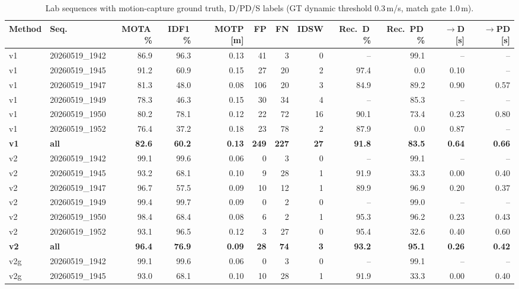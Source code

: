 \begin{table}[t]
\centering
\caption{Lab sequences with motion-capture ground truth, D/PD/S labels (GT dynamic threshold 0.3\,m/s, match gate 1.0\,m).}
\label{tab:own_r8a_full}
\setlength{\tabcolsep}{3pt}
\begin{tabular}{llrrrrrrrrrr}
\toprule
Method & Seq. & MOTA\,\% & IDF1\,\% & MOTP [m] & FP & FN & IDSW & Rec.\ D\,\% & Rec.\ PD\,\% & $\to$D [s] & $\to$PD [s] \\
\midrule
v1 & 20260519\_1942 & 86.9 & 96.3 & 0.13 & 41 & 3 & 0 & -- & 99.1 & -- & -- \\
v1 & 20260519\_1945 & 91.2 & 60.9 & 0.15 & 27 & 20 & 2 & 97.4 & 0.0 & 0.10 & -- \\
v1 & 20260519\_1947 & 81.3 & 48.0 & 0.08 & 106 & 20 & 3 & 84.9 & 89.2 & 0.90 & 0.57 \\
v1 & 20260519\_1949 & 78.3 & 46.3 & 0.15 & 30 & 34 & 4 & -- & 85.3 & -- & -- \\
v1 & 20260519\_1950 & 80.2 & 78.1 & 0.12 & 22 & 72 & 16 & 90.1 & 73.4 & 0.23 & 0.80 \\
v1 & 20260519\_1952 & 76.4 & 37.2 & 0.18 & 23 & 78 & 2 & 87.9 & 0.0 & 0.87 & -- \\
\textbf{v1} & \textbf{all} & \textbf{82.6} & \textbf{60.2} & \textbf{0.13} & \textbf{249} & \textbf{227} & \textbf{27} & \textbf{91.8} & \textbf{83.5} & \textbf{0.64} & \textbf{0.66} \\
\midrule
v2 & 20260519\_1942 & 99.1 & 99.6 & 0.06 & 0 & 3 & 0 & -- & 99.1 & -- & -- \\
v2 & 20260519\_1945 & 93.2 & 68.1 & 0.10 & 9 & 28 & 1 & 91.9 & 33.3 & 0.00 & 0.40 \\
v2 & 20260519\_1947 & 96.7 & 57.5 & 0.09 & 10 & 12 & 1 & 89.9 & 96.9 & 0.20 & 0.37 \\
v2 & 20260519\_1949 & 99.4 & 99.7 & 0.09 & 0 & 2 & 0 & -- & 99.0 & -- & -- \\
v2 & 20260519\_1950 & 98.4 & 68.4 & 0.08 & 6 & 2 & 1 & 95.3 & 96.2 & 0.23 & 0.43 \\
v2 & 20260519\_1952 & 93.1 & 96.5 & 0.12 & 3 & 27 & 0 & 95.4 & 32.6 & 0.40 & 0.60 \\
\textbf{v2} & \textbf{all} & \textbf{96.4} & \textbf{76.9} & \textbf{0.09} & \textbf{28} & \textbf{74} & \textbf{3} & \textbf{93.2} & \textbf{95.1} & \textbf{0.26} & \textbf{0.42} \\
\midrule
v2g & 20260519\_1942 & 99.1 & 99.6 & 0.06 & 0 & 3 & 0 & -- & 99.1 & -- & -- \\
v2g & 20260519\_1945 & 93.0 & 68.1 & 0.10 & 10 & 28 & 1 & 91.9 & 33.3 & 0.00 & 0.40 \\

\end{tabular}
\end{table}
